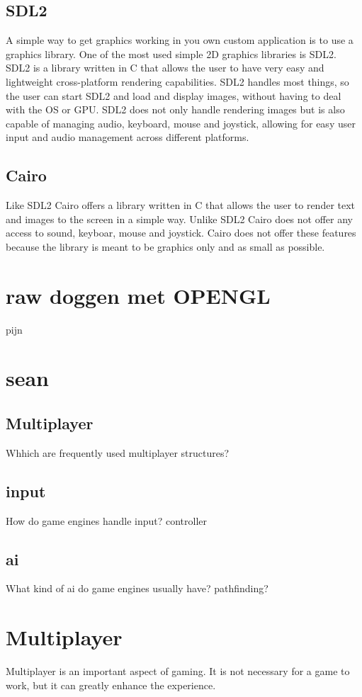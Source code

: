 \documentclass{article} %
\begin{document}
\subsection{SDL2}
A simple way to get graphics working in you own custom application is to use a graphics library.
One of the most used simple 2D graphics libraries is SDL2.
SDL2 is a library written in C that allows the user to have very easy and lightweight cross-platform rendering capabilities.
SDL2 handles most things, so the user can start SDL2 and load and display images, without having to deal with the OS or GPU.
SDL2 does not only handle rendering images but is also capable of managing audio, keyboard, mouse and joystick, allowing for easy user input and audio management across different platforms.

\subsection{Cairo}
Like SDL2 Cairo offers a library written in C that allows the user to render text and images to the screen in a simple way.
Unlike SDL2 Cairo does not offer any access to sound, keyboar, mouse and joystick.
Cairo does not offer these features because the library is meant to be graphics only and as small as possible.

\section{raw doggen met OPENGL}
pijn
\newpage


\section{sean}
\subsection{Multiplayer}
Whhich are frequently used multiplayer structures?
\subsection{input}
How do game engines handle input?
controller
\subsection{ai}
What kind of ai do game engines usually have?
pathfinding?
\newpage

\section{Multiplayer}
Multiplayer is an important aspect of gaming. It is not necessary for a game to work, but it can greatly enhance the experience.
\end{document}
